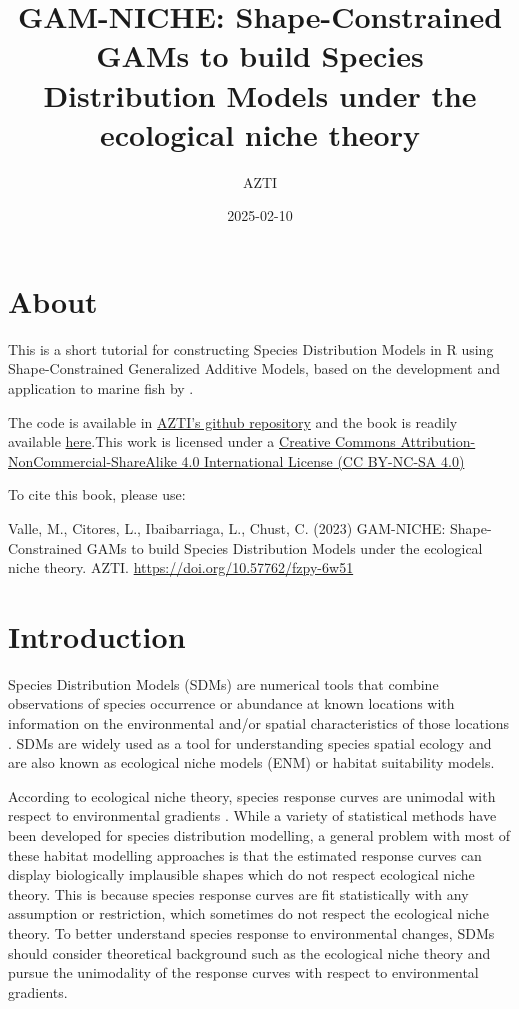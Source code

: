 \documentclass[
]{book}
\title{GAM-NICHE: Shape-Constrained GAMs to build Species Distribution Models under the ecological niche theory}
\author{AZTI}
\date{2025-02-10}
\begin{document}
\maketitle

{
\setcounter{tocdepth}{1}
\tableofcontents
}
\chapter*{About}\label{about}

This is a short tutorial for constructing Species Distribution Models in R using Shape-Constrained Generalized Additive Models, based on the development and application to marine fish by \citet{citores_etal_2020}.

The code is available in \href{https://github.com/Fundacion-AZTI/gam-niche}{AZTI's github repository} and the book is readily available \href{https://fundacion-azti.github.io/gam-niche/}{here}.This work is licensed under a \href{https://creativecommons.org/licenses/by-nc-sa/4.0/}{Creative Commons Attribution-NonCommercial-ShareAlike 4.0 International License (CC BY-NC-SA 4.0)}

To cite this book, please use:

Valle, M., Citores, L., Ibaibarriaga, L., Chust, C. (2023) GAM-NICHE: Shape-Constrained GAMs to build Species Distribution Models under the ecological niche theory. AZTI. \url{https://doi.org/10.57762/fzpy-6w51}

\chapter{Introduction}\label{introduction}

Species Distribution Models (SDMs) are numerical tools that combine observations of species occurrence or abundance at known locations with information on the environmental and/or spatial characteristics of those locations \citep{elith_etal_2009}. SDMs are widely used as a tool for understanding species spatial ecology and are also known as ecological niche models (ENM) or habitat suitability models.

According to ecological niche theory, species response curves are unimodal with respect to environmental gradients \citep{hutchinson_1957}. While a variety of statistical methods have been developed for species distribution modelling, a general problem with most of these habitat modelling approaches is that the estimated response curves can display biologically implausible shapes which do not respect ecological niche theory. This is because species response curves are fit statistically with any assumption or restriction, which sometimes do not respect the ecological niche theory. To better understand species response to environmental changes, SDMs should consider theoretical background such as the ecological niche theory and pursue the unimodality of the response curves with respect to environmental gradients.
\end{document}
